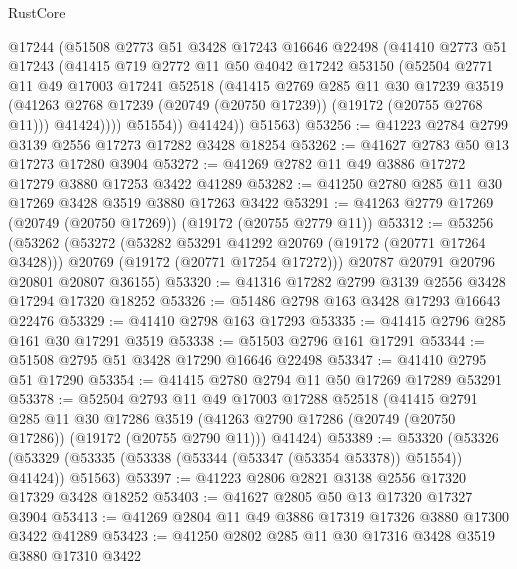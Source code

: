 \begin{lexlean}{RustCore}
\begin{coremodule}
            @17244
            (@51508
              @2773
              @51
              @3428
              @17243
              @16646
              @22498
              (@41410
                @2773
                @51
                @17243
                (@41415
                  @719
                  @2772
                  @11
                  @50
                  @4042
                  @17242
                  @53150
                  (@52504
                    @2771
                    @11
                    @49
                    @17003
                    @17241
                    @52518
                    (@41415
                      @2769
                      @285
                      @11
                      @30
                      @17239
                      @3519
                      (@41263 @2768 @17239 (@20749 (@20750 @17239)) (@19172 (@20755 @2768 @11)))
                      @41424))))
              @51554))
          @41424))
      @51563)
@53256 := @41223 @2784 @2799 @3139 @2556 @17273 @17282 @3428 @18254
@53262 := @41627 @2783 @50 @13 @17273 @17280 @3904
@53272 := @41269 @2782 @11 @49 @3886 @17272 @17279 @3880 @17253 @3422 @41289
@53282 := @41250 @2780 @285 @11 @30 @17269 @3428 @3519 @3880 @17263 @3422
@53291 := @41263 @2779 @17269 (@20749 (@20750 @17269)) (@19172 (@20755 @2779 @11))
@53312 := @53256
    (@53262
      (@53272
        (@53282 @53291 @41292 @20769 (@19172 (@20771 @17264 @3428)))
        @20769
        (@19172 (@20771 @17254 @17272)))
      @20787
      @20791
      @20796
      @20801
      @20807
      @36155)
@53320 := @41316 @17282 @2799 @3139 @2556 @3428 @17294 @17320 @18252
@53326 := @51486 @2798 @163 @3428 @17293 @16643 @22476
@53329 := @41410 @2798 @163 @17293
@53335 := @41415 @2796 @285 @161 @30 @17291 @3519
@53338 := @51503 @2796 @161 @17291
@53344 := @51508 @2795 @51 @3428 @17290 @16646 @22498
@53347 := @41410 @2795 @51 @17290
@53354 := @41415 @2780 @2794 @11 @50 @17269 @17289 @53291
@53378 := @52504
    @2793
    @11
    @49
    @17003
    @17288
    @52518
    (@41415
      @2791
      @285
      @11
      @30
      @17286
      @3519
      (@41263 @2790 @17286 (@20749 (@20750 @17286)) (@19172 (@20755 @2790 @11)))
      @41424)
@53389 := @53320
    (@53326 (@53329 (@53335 (@53338 (@53344 (@53347 (@53354 @53378)) @51554)) @41424)) @51563)
@53397 := @41223 @2806 @2821 @3138 @2556 @17320 @17329 @3428 @18252
@53403 := @41627 @2805 @50 @13 @17320 @17327 @3904
@53413 := @41269 @2804 @11 @49 @3886 @17319 @17326 @3880 @17300 @3422 @41289
@53423 := @41250 @2802 @285 @11 @30 @17316 @3428 @3519 @3880 @17310 @3422

\end{coremodule}
\end{lexlean}
